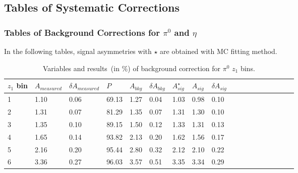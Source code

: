 \subsection{Tables of Systematic Corrections}
\subsubsection{\texorpdfstring{Tables of Background Corrections for $\pi^0$ and $\eta$}{Tables of Background Correction for pi0 and eta}}

In the following tables, signal asymmetries with $\star$ are obtained with MC fitting method.
\begin{table}[H]\footnotesize
\centering
\begin{tabular}{|l|l|l|l|l|l|l|l|l|l|l|l|l|l|l|l|l|l|}
\\ \hline
$z_1$ bin & $A_{measured}$ & $\delta A_{measured}$ & $P$ & $A_{bkg}$ & $\delta A_{bkg}$ & $A_{sig}^{\star}$ & $ A_{sig}$  & $\delta A_{sig}$ \\ \hline
1 & 1.10 & 0.06 & 69.13 & 1.27 & 0.04 & 1.03 & 0.98 & 0.10 \\ \hline 
2 & 1.31 & 0.07 & 81.29 & 1.35 & 0.07 & 1.31 & 1.30 & 0.10 \\ \hline 
3 & 1.35 & 0.10 & 89.15 & 1.50 & 0.12 & 1.33 & 1.31 & 0.13 \\ \hline 
4 & 1.65 & 0.14 & 93.82 & 2.13 & 0.20 & 1.62 & 1.56 & 0.17 \\ \hline 
5 & 2.16 & 0.20 & 95.44 & 2.80 & 0.32 & 2.12 & 2.10 & 0.22 \\ \hline 
6 & 3.36 & 0.27 & 96.03 & 3.57 & 0.51 & 3.35 & 3.34 & 0.29 \\ \hline 
\end{tabular}
\caption{Variables and results~(in $\%$) of background correction for $\pi^0$ $z_1$ bins. }
\label{tab:sinzbkgcor}
\end{table}

